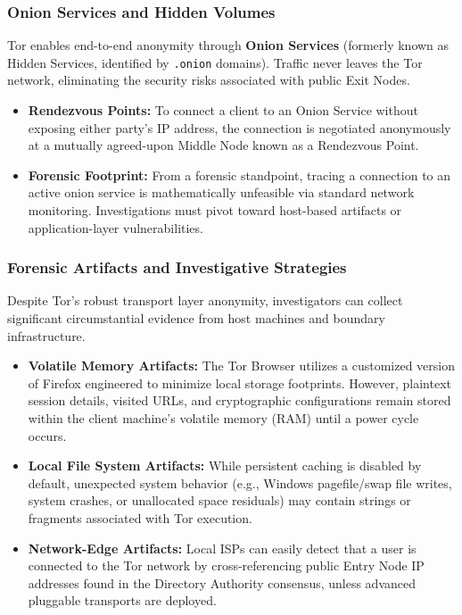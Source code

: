 \subsubsection*{Onion Services and Hidden Volumes}
Tor enables end-to-end anonymity through \textbf{Onion Services} (formerly known as Hidden Services, identified by \texttt{.onion} domains). Traffic never leaves the Tor network, eliminating the security risks associated with public Exit Nodes.
\begin{itemize}
    \item \textbf{Rendezvous Points:} To connect a client to an Onion Service without exposing either party's IP address, the connection is negotiated anonymously at a mutually agreed-upon Middle Node known as a Rendezvous Point.
    \item \textbf{Forensic Footprint:} From a forensic standpoint, tracing a connection to an active onion service is mathematically unfeasible via standard network monitoring. Investigations must pivot toward host-based artifacts or application-layer vulnerabilities.
\end{itemize}

\subsubsection*{Forensic Artifacts and Investigative Strategies}
Despite Tor's robust transport layer anonymity, investigators can collect significant circumstantial evidence from host machines and boundary infrastructure.

\begin{itemize}
    \item \textbf{Volatile Memory Artifacts:} The Tor Browser utilizes a customized version of Firefox engineered to minimize local storage footprints. However, plaintext session details, visited URLs, and cryptographic configurations remain stored within the client machine's volatile memory (RAM) until a power cycle occurs.
    \item \textbf{Local File System Artifacts:} While persistent caching is disabled by default, unexpected system behavior (e.g., Windows pagefile/swap file writes, system crashes, or unallocated space residuals) may contain strings or fragments associated with Tor execution.
    \item \textbf{Network-Edge Artifacts:} Local ISPs can easily detect that a user is connected to the Tor network by cross-referencing public Entry Node IP addresses found in the Directory Authority consensus, unless advanced pluggable transports are deployed.
\end{itemize}
